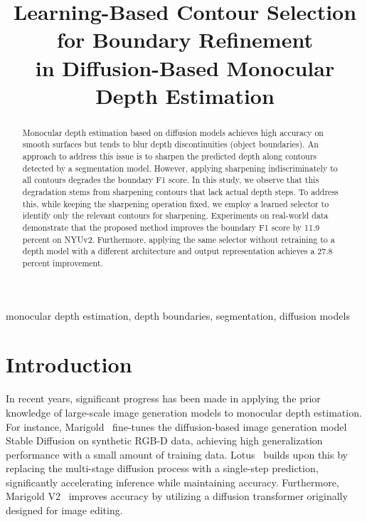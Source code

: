 \documentclass[conference]{IEEEtran}
\begin{document}
\title{Learning-Based Contour Selection\\for Boundary Refinement\\in Diffusion-Based Monocular Depth Estimation}

\author{
}

\maketitle

\begin{abstract}
Monocular depth estimation based on diffusion models achieves high accuracy on
smooth surfaces but tends to blur depth discontinuities (object boundaries). An
approach to address this issue is to sharpen the predicted depth along contours
detected by a segmentation model. However, applying sharpening indiscriminately to
all contours degrades the boundary F1 score. In this study, we observe that
this degradation stems from sharpening contours that lack actual depth steps. To
address this, while keeping the sharpening operation fixed, we employ a learned
selector to identify only the relevant contours for sharpening. Experiments on
real-world data demonstrate that the proposed method improves the boundary
F1 score by 11.9 percent on NYUv2. Furthermore, applying the same selector without
retraining to a depth model with a different architecture and output
representation achieves a 27.8 percent improvement.
\end{abstract}

\begin{IEEEkeywords}
monocular depth estimation, depth boundaries, segmentation, diffusion models
\end{IEEEkeywords}

\section{Introduction}

In recent years, significant progress has been made in applying the prior
knowledge of large-scale image generation models to monocular depth estimation.
For instance, Marigold~\cite{marigold} fine-tunes the diffusion-based image
generation model Stable Diffusion on synthetic RGB-D data, achieving high
generalization performance with a small amount of training data.
Lotus~\cite{lotus} builds upon this by replacing the multi-stage diffusion process
with a single-step prediction, significantly accelerating inference while
maintaining accuracy. Furthermore, Marigold V2~\cite{marigoldv2} improves accuracy
by utilizing a diffusion transformer originally designed for image editing.
\end{document}
